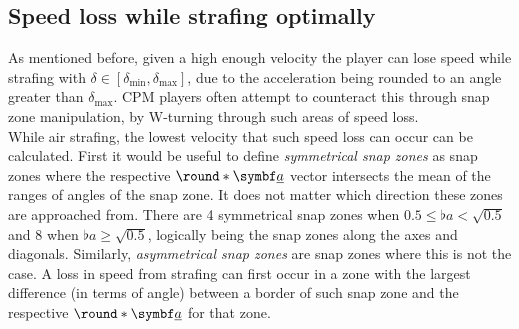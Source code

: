 \subsection{Speed loss while strafing optimally}
\label{sec:speed_loss_while_strafing}
As mentioned before, given a high enough velocity the player can lose speed while strafing with $\delta \in [\delta_{\min}, \delta_{\max}]$, due to the acceleration being rounded to an angle greater than $\delta_{\max}$. CPM players often attempt to counteract this through snap zone manipulation, by W-turning through such areas of speed loss.\\

While air strafing, the lowest velocity that such speed loss can occur can be calculated. First it would be useful to define \emph{symmetrical snap zones} as snap zones where the respective $\round*{\vec{\flat{a}}}$ vector intersects the mean of the ranges of angles of the snap zone. It does not matter which direction these zones are approached from. There are 4 symmetrical snap zones when $0.5\le \flat{a} < \sqrt{0.5}$ and 8 when $\flat{a}\ge \sqrt{0.5}$, logically being the snap zones along the axes and diagonals.
Similarly, \emph{asymmetrical snap zones} are snap zones where this is not the case.
A loss in speed from strafing can first occur in a zone with the largest difference (in terms of angle) between a border of such snap zone and the respective $\round*{\vec{\flat{a}}}$ for that zone.\\

